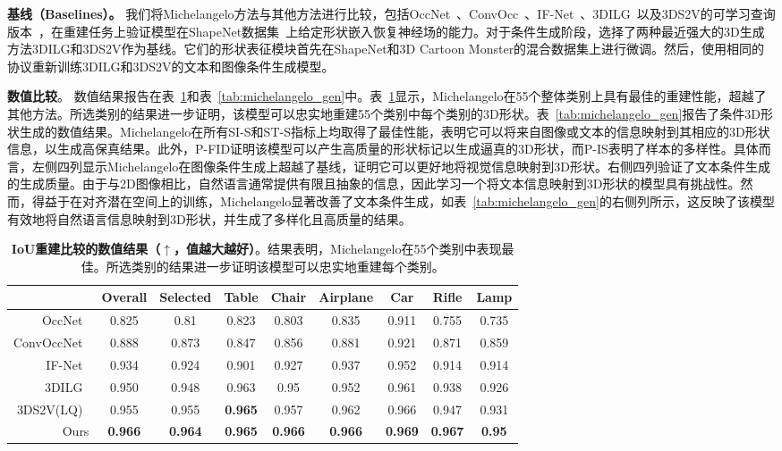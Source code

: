 \documentclass[../../book-main_zh.tex]{subfiles}
\begin{document}
\textbf{基线（Baselines）。}
我们将Michelangelo方法与其他方法进行比较，包括OccNet~\cite{8953655}、ConvOcc~\cite{10.1007/978-3-030-58580-8_31}、IF-Net~\cite{9156292}、3DILG~\cite{NEURIPS2022_894ca1c4}以及3DS2V的可学习查询版本~\cite{10.1145/3592442}，在重建任务上验证模型在ShapeNet数据集~\cite{chang2015shapenet}上给定形状嵌入恢复神经场的能力。对于条件生成阶段，选择了两种最近强大的3D生成方法3DILG和3DS2V作为基线。它们的形状表征模块首先在ShapeNet和3D Cartoon Monster的混合数据集上进行微调。然后，使用相同的协议重新训练3DILG和3DS2V的文本和图像条件生成模型。

\textbf{数值比较}。
数值结果报告在表~\ref{tab:michelangelo_recon}和表~\ref{tab:michelangelo_gen}中。表~\ref{tab:michelangelo_recon}显示，Michelangelo在55个整体类别上具有最佳的重建性能，超越了其他方法。所选类别的结果进一步证明，该模型可以忠实地重建55个类别中每个类别的3D形状。表~\ref{tab:michelangelo_gen}报告了条件3D形状生成的数值结果。Michelangelo在所有SI-S和ST-S指标上均取得了最佳性能，表明它可以将来自图像或文本的信息映射到其相应的3D形状信息，以生成高保真结果。此外，P-FID证明该模型可以产生高质量的形状标记以生成逼真的3D形状，而P-IS表明了样本的多样性。具体而言，左侧四列显示Michelangelo在图像条件生成上超越了基线，证明它可以更好地将视觉信息映射到3D形状。右侧四列验证了文本条件生成的生成质量。由于与2D图像相比，自然语言通常提供有限且抽象的信息，因此学习一个将文本信息映射到3D形状的模型具有挑战性。然而，得益于在对齐潜在空间上的训练，Michelangelo显著改善了文本条件生成，如表~\ref{tab:michelangelo_gen}的右侧列所示，这反映了该模型有效地将自然语言信息映射到3D形状，并生成了多样化且高质量的结果。

\begin{table}[th]
\centering
\resizebox{1\columnwidth}{!}
{
    \begin{tabular}{rcccccccc}
        \hline
        & Overall & Selected & Table & Chair & Airplane & Car & Rifle
        & Lamp   \\ \hline
        OccNet~\cite{8953655}
        & 0.825 & 0.81 & 0.823 & 0.803 & 0.835 & 0.911 & 0.755 & 0.735  \\
        ConvOccNet~\cite{10.1007/978-3-030-58580-8_31}
        & 0.888 & 0.873 & 0.847 & 0.856 & 0.881 & 0.921 & 0.871 & 0.859  \\
        IF-Net~\cite{9156292}
        & 0.934 & 0.924 & 0.901 & 0.927 & 0.937 & 0.952 & 0.914 & 0.914 \\
        3DILG~\cite{NEURIPS2022_894ca1c4}
        & 0.950 & 0.948 & 0.963 & 0.95 & 0.952 & 0.961 & 0.938 & 0.926 \\
        3DS2V(LQ)~\cite{10.1145/3592442}
        & 0.955 & 0.955 & \textbf{0.965} & 0.957 & 0.962 & 0.966 &
        0.947 & 0.931 \\
        Ours
        & \textbf{0.966} & \textbf{0.964} & \textbf{0.965} &
        \textbf{0.966} & \textbf{0.966} & \textbf{0.969} &
        \textbf{0.967} & \textbf{0.95} \\ \hline
    \end{tabular}
}
\caption{\textbf{IoU重建比较的数值结果（$\uparrow$，值越大越好）}。结果表明，Michelangelo在55个类别中表现最佳。所选类别的结果进一步证明该模型可以忠实地重建每个类别。}
\label{tab:michelangelo_recon}
\end{table}
\end{document}
